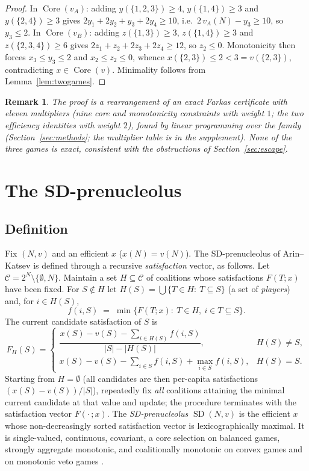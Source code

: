 \documentclass[11pt]{article}
\newtheorem{remark}[theorem]{Remark}
\newcommand{\core}{\operatorname{Core}}
\newcommand{\SD}{\operatorname{SD}}
\begin{document}
\begin{proof}
In $\core(v_A)$: adding $y(\{1,2,3\})\ge 4$, $y(\{1,4\})\ge 3$ and
$y(\{2,4\})\ge 3$ gives $2y_1+2y_2+y_3+2y_4\ge 10$, i.e.\
$2\,v_A(N)-y_3\ge 10$, so $y_3\le 2$. In $\core(v_B)$: adding
$z(\{1,3\})\ge 3$, $z(\{1,4\})\ge 3$ and $z(\{2,3,4\})\ge 6$ gives
$2z_1+z_2+2z_3+2z_4\ge 12$, so $z_2\le 0$. Monotonicity then forces
$x_3\le y_3\le 2$ and $x_2\le z_2\le 0$, whence
$x(\{2,3\})\le 2<3=v(\{2,3\})$, contradicting $x\in\core(v)$. Minimality
follows from Lemma~\ref{lem:twogames}.
\end{proof}

\begin{remark}
The proof is a rearrangement of an exact Farkas certificate with eleven
multipliers (nine core and monotonicity constraints with weight $1$; the two
efficiency identities with weight $2$), found by linear programming over
the family (Section~\ref{sec:methods}; the multiplier table is in the
supplement). None of the three games is exact, consistent with the
obstructions of Section~\ref{sec:escape}.
\end{remark}

\section{The SD-prenucleolus}\label{sec:sd-def}

\subsection{Definition}

Fix $(N,v)$ and an efficient $x$ ($x(N)=v(N)$). The SD-prenucleolus of
Arin--Katsev \citep{ArinKatsev2011,ArinKatsev2014} is defined through a
recursive \emph{satisfaction} vector, as follows. Let
$\mathcal{C}=2^N\setminus\{\emptyset,N\}$. Maintain a set
$H\subseteq\mathcal{C}$ of coalitions whose satisfactions $F(T;x)$ have been
fixed. For $S\notin H$ let
$H(S)=\bigcup\{T\in H:\ T\subseteq S\}$ (a set of \emph{players}) and, for
$i\in H(S)$,
\[
f(i,S)\;=\;\min\{F(T;x):\ T\in H,\ i\in T\subseteq S\}.
\]
The current candidate satisfaction of $S$ is
\[
F_H(S)=
\begin{cases}
\dfrac{x(S)-v(S)-\sum_{i\in H(S)}f(i,S)}{|S|-|H(S)|}, & H(S)\neq S,\\[1.4em]
x(S)-v(S)-\sum_{i\in S}f(i,S)+\max_{i\in S}f(i,S), & H(S)=S.
\end{cases}
\]
Starting from $H=\emptyset$ (all candidates are then per-capita
satisfactions $(x(S)-v(S))/|S|$), repeatedly fix \emph{all} coalitions
attaining the minimal current candidate at that value and update; the
procedure terminates with the satisfaction vector $F(\cdot\,;x)$. The
\emph{SD-prenucleolus} $\SD(N,v)$ is the efficient $x$ whose non-decreasingly
sorted satisfaction vector is lexicographically maximal. It is single-valued,
continuous, covariant, a core selection on balanced games, strongly aggregate
monotonic, and coalitionally monotonic on convex games and on monotonic veto
games \citep{ArinKatsev2011,ArinKatsev2014,ArinKatsev2016,ArinKatsev2018}.
\end{document}
